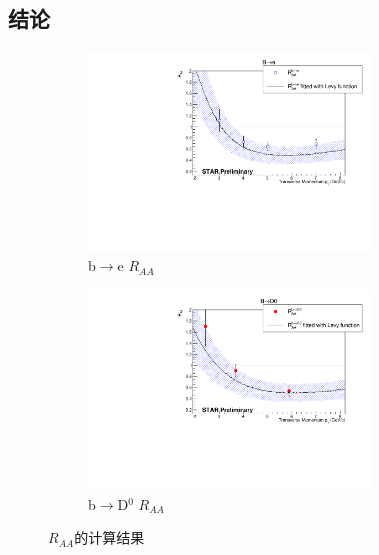 \documentclass[12pt, a4paper]{ctexart}
\begin{document}

\subsection{结论} %
\label{sub:结论}


\begin{figure}[h]
\begin{subfigure}[h]{0.5\textwidth}\centering
	\includegraphics[width=7.5cm]{figures/B2e.pdf}
	\caption{b$\to$e $R_{AA}$}
	\label{b2e0}
\end{subfigure}
\begin{subfigure}[h]{0.5\textwidth}\centering
	\includegraphics[width=7.5cm]{figures/B2D0.pdf}
	\caption{b$\to$D$^0$ $R_{AA}$}
	\label{b2d}
\end{subfigure}
\caption{$R_{AA}$的计算结果}
\end{figure}
\end{document}
